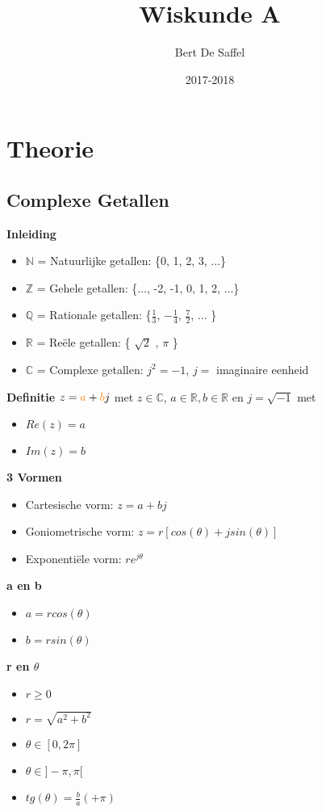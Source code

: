 \documentclass[12pt]{report}
\title{Wiskunde A}
\author{Bert De Saffel}
\date{2017-2018}
\newcommand{\important}[1] {\textbf{\color{orange}#1}}
\newcommand{\mathimportant}[2] {\textbf{\color{#2}$#1$}}
\begin{document}
\maketitle
\tableofcontents

\part{Theorie}
\chapter{Complexe Getallen}
\important{Inleiding}
\begin{itemize}
 \item $\mathbb{N}$ = Natuurlijke getallen: \{0, 1, 2, 3, ...\}
 \item $\mathbb{Z}$ = Gehele getallen: \{..., -2, -1, 0, 1, 2, ...\}
 \item $\mathbb{Q}$ = Rationale getallen: \{$\frac{1}{3}$, $-\frac{1}{4}$, $\frac{7}{2}$, ... \}
 \item $\mathbb{R}$ = Reële getallen: \{ $\sqrt{2}$ , $\pi$ \}
 \item $\mathbb{C}$ = Complexe getallen: $j^2 = -1$, $j = $ imaginaire eenheid
\end{itemize}
\important{Definitie}
$z = \mathimportant{a}{orange} + \mathimportant{b}{orange}j$ met $z \in \mathbb{C}$, $a \in \mathbb{R}, b \in \mathbb{R}$ en $j = \sqrt{-1}$ met
\begin{itemize}
 \item $Re(z) = a$
 \item $Im(z) = b$
\end{itemize}
\important{3 Vormen}
\begin{itemize}
 \item Cartesische vorm: $z = a + bj$
 \item Goniometrische vorm: $z = r[cos(\theta) + jsin(\theta)]$
 \item Exponentiële vorm: $re^{j\theta}$
\end{itemize}
\important{a en b}
\begin{itemize}
 \item $a = rcos(\theta)$
 \item $b = rsin(\theta)$
\end{itemize}
\important{r en $\theta$}
\begin{itemize}
 \item $r \geq 0$
 \item $r = \sqrt{a^2 + b^2}$
 
 \item $\theta \in [0, 2\pi]$
 \item $\theta \in ]-\pi, \pi[$
 \item $tg(\theta) = \frac{b}{a} (+ \pi)$
\end{itemize}
\end{document}
